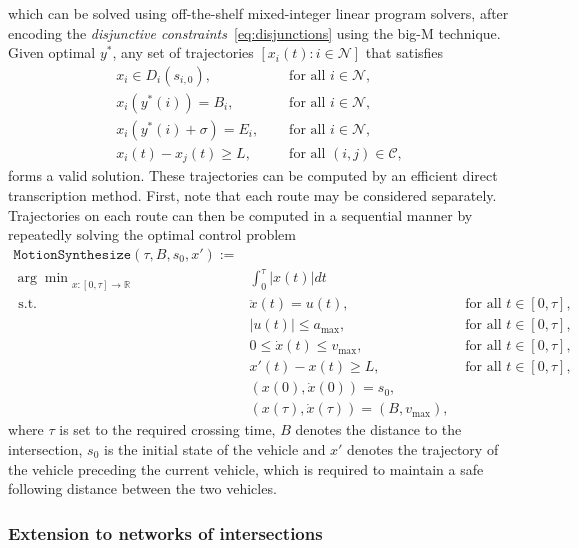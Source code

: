 \documentclass{article}
\theoremstyle{definition}
\theoremstyle{plain}
\begin{document}
which can be solved using off-the-shelf mixed-integer linear program solvers,
after encoding the \textit{disjunctive constraints}~\eqref{eq:disjunctions} using the big-M
technique. Given optimal $y^{*}$, any set of trajectories
$[x_{i}(t) : i \in \mathcal{N}]$ that satisfies
\begin{align*}
  x_{i} \in D_{i}(s_{i,0}) , \quad & \text{ for all } i \in \mathcal{N} , \\
  x_{i}(y^{*}(i)) = B_{i} , \quad & \text{ for all } i \in \mathcal{N} , \\
  x_{i}(y^{*}(i) + \sigma) = E_{i} , \quad & \text{ for all } i \in \mathcal{N} , \\
  x_{i}(t) - x_{j}(t) \geq L , \quad & \text{ for all } (i,j) \in \mathcal{C} ,
\end{align*}
forms a valid solution. These trajectories can be computed by an efficient
direct transcription method. First, note that each route may be considered
separately. Trajectories on each route can then be computed in a sequential
manner by repeatedly solving the optimal control problem
%
\begin{align*}
\texttt{MotionSynthesize}(\tau, B, s_{0}, x') := \\
  {\arg\min}_{x: [0, \tau] \rightarrow \mathbb{R}} & \int_{0}^{\tau} |x(t)| dt \\
  \text{ s.t. } & \ddot{x}(t) = u(t) , &  \text{ for all } t \in [0, \tau] , \\
  & |u(t)| \leq a_{\max} , &  \text{ for all } t \in [0, \tau] , \\
  & 0 \leq \dot{x}(t) \leq v_{\max} , &  \text{ for all } t \in [0, \tau] , \\
  & x'(t) - x(t) \geq L , &  \text{ for all } t \in [0, \tau] , \\
  & (x(0), \dot{x}(0)) = s_{0} , \\
  & (x(\tau), \dot{x}(\tau)) = (B, v_{\max}) ,
\end{align*}
where $\tau$ is set to the required crossing time, $B$ denotes the distance to the
intersection, $s_{0}$ is the initial state of the vehicle and $x'$ denotes the
trajectory of the vehicle preceding the current vehicle, which is required to
maintain a safe following distance between the two vehicles.

\subsubsection{Extension to networks of intersections}
\end{document}
